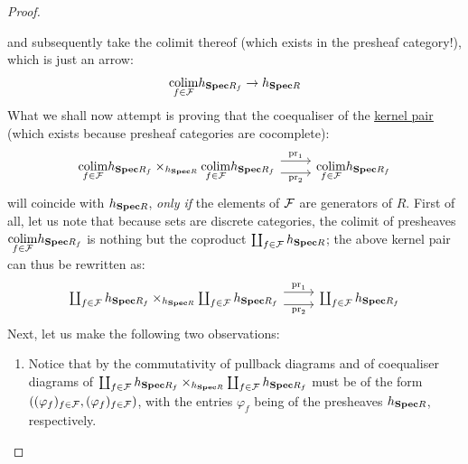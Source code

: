 \begin{proof}
\begin{enumerate}
\begin{enumerate}
                                        and subsequently take the colimit thereof (which exists in the presheaf category!), which is just an arrow:
                                            $$\underset{f \in \mathcal{F}}{\operatorname{colim}} h_{\mathbf{Spec} R_f} \to h_{\mathbf{Spec} R}$$
                                        What we shall now attempt is proving that the coequaliser of the \href{https://ncatlab.org/nlab/show/kernel+pair}{\underline{kernel pair}} (which exists because presheaf categories are cocomplete):
                                            $$
                                                \begin{tikzcd}
                                                	{\underset{f \in \calF}{\colim} h_{\Spec R_f} \x_{h_{\Spec R}} \underset{f \in \calF}{\colim} h_{\Spec R_f}} & {\underset{f \in \calF}{\colim} h_{\Spec R_f}}
                                                	\arrow["{\pr_2}"', shift right=2, from=1-1, to=1-2]
                                                	\arrow["{\pr_1}", shift left=2, from=1-1, to=1-2]
                                                \end{tikzcd}
                                            $$
                                        will coincide with $h_{\mathbf{Spec} R}$, \textit{only if} the elements of $\mathcal{F}$ are generators of $R$. First of all, let us note that because sets are discrete categories, the colimit of presheaves $\underset{f \in \mathcal{F}}{\operatorname{colim}} h_{\mathbf{Spec} R_f}$ is nothing but the coproduct $\coprod_{f \in \mathcal{F}} h_{\mathbf{Spec} R}$; the above kernel pair can thus be rewritten as:
                                            $$
                                                \begin{tikzcd}
                                                	{\coprod_{f \in \calF} h_{\Spec R_f} \x_{h_{\Spec R}} \coprod_{f \in \calF} h_{\Spec R_f}} & {\coprod_{f \in \calF} h_{\Spec R_f}}
                                                	\arrow["{\pr_2}"', shift right=2, from=1-1, to=1-2]
                                                	\arrow["{\pr_1}", shift left=2, from=1-1, to=1-2]
                                                \end{tikzcd}
                                            $$
                                        Next, let us make the following two observations:
                                            \begin{enumerate}
                                                \item Notice that by the commutativity of pullback diagrams and of coequaliser diagrams  of $\coprod_{f \in \calF} h_{\Spec R_f} \x_{h_{\Spec R}} \coprod_{f \in \calF} h_{\Spec R_f}$ must be of the form $\left((\varphi_f)_{f \in \mathcal{F}}, (\varphi_f)_{f \in \mathcal{F}}\right)$, with the entries $\varphi_f$ being  of the presheaves $h_{\mathbf{Spec} R}$, respectively.

\end{enumerate}
\end{enumerate}
\end{enumerate}
\end{proof}
